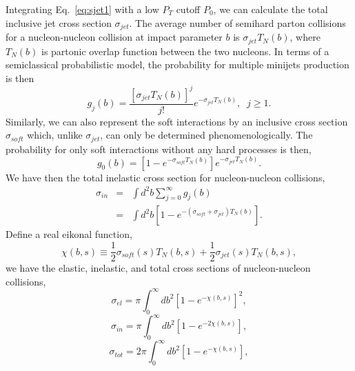         Integrating Eq.~\ref{eq:sjet1} with a low $P_T$ 
cutoff $P_0$, we can calculate the total inclusive jet cross 
section $\sigma_{jet}$. The average number of semihard parton collisions
for a nucleon-nucleon collision at impact parameter $b$ is 
$\sigma_{jet}T_N(b)$, where $T_N(b)$ is partonic overlap function 
between the two nucleons. In terms of a semiclassical 
probabilistic model\cite{gaisser,wang91a,heureux}, the probability 
for multiple minijets production is then
\begin{equation}
        g_j(b)=\frac{[\sigma_{jet}T_N(b)]^j}{j!}e^{-\sigma_{jet}T_N(b)},\;\;
                j\geq 1. \label{eq:sjet3}
\end{equation}
Similarly, we can also represent the soft interactions by 
an inclusive cross section $\sigma_{soft}$ which, unlike 
$\sigma_{jet}$, can only be determined phenomenologically.  
The probability for only soft interactions without any hard 
processes is then,
\begin{equation}
        g_0(b)=[1-e^{-\sigma_{soft}T_N(b)}]e^{-\sigma_{jet}T_N(b)}.
                \label{eq:sjet4}
\end{equation}
We have then the total inelastic cross section for nucleon-nucleon 
collisions,
\begin{eqnarray}
        \sigma_{in}&=&\int{d^2b}\sum_{j=0}^{\infty}g_j(b) \nonumber \\
        &=&\int{d^2b}[1-e^{-(\sigma_{soft}+\sigma_{jet})T_N(b)}].
                \label{eq:cin}
\end{eqnarray}
Define a real eikonal function,
\begin{equation}
        \chi(b,s)\equiv\frac{1}{2}\sigma_{soft}(s)T_N(b,s)+
                        \frac{1}{2}\sigma_{jet}(s)T_N(b,s), \label{eq:eiko}
\end{equation}
we have the elastic, inelastic, and total cross sections of
nucleon-nucleon collisions,
\begin{equation}
        \sigma_{el}=\pi\int_{0}^{\infty}db^2\left[1-
                e^{-\chi(b,s)}\right]^2, \label{eq:cin1}
\end{equation}
\begin{equation}
        \sigma_{in}=\pi\int_{0}^{\infty}db^2\left[1-
                e^{-2\chi(b,s)}\right],\label{eq:cin2}
\end{equation}
\begin{equation}
        \sigma_{tot}=2\pi\int_{0}^{\infty}db^2\left[1-
                e^{-\chi(b,s)}\right],\label{eq:cin3}
\end{equation}
